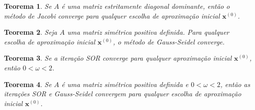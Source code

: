 \documentclass{article}
\theoremstyle{plain}
\newtheorem{thm}{Teorema}[section]
\theoremstyle{definition}
\theoremstyle{remark}
\begin{document}
\begin{thm}
  Se \(A\) é uma matriz estritamente diagonal dominante, então o método de Jacobi converge para qualquer escolha de aproximação inicial \(\mathbf{x}^{(0)}\).
\end{thm}

\begin{thm}\label{thm:gs_convergence}
  Seja \(A\) uma matriz simétrica positiva definida. Para qualquer escolha de aproximação inicial \(\mathbf{x}^{(0)}\), o método de Gauss-Seidel converge.
\end{thm}

\begin{thm}
  Se a iteração SOR converge para qualquer aproximação inicial \(\mathbf{x}^{(0)}\), então \(0 < \omega < 2\).
\end{thm}

\begin{thm}
  Se \(A\) é uma matriz simétrica positiva definida e \(0 < \omega < 2\), então as iterações SOR e Gauss-Seidel convergem para qualquer escolha de aproximação inicial \(\mathbf{x}^{(0)}\).
\end{thm}
\end{document}
